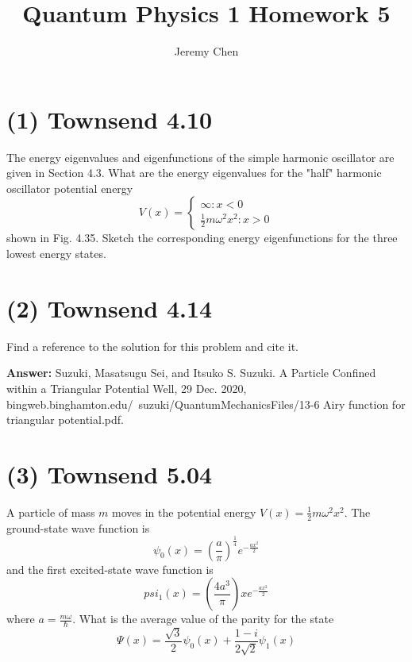 \documentclass[10pt,letterpaper]{article}
\title{Quantum Physics 1 Homework 5}
\author{Jeremy Chen}
\begin{document}
	\maketitle
\section*{(1) Townsend 4.10}
The energy eigenvalues and eigenfunctions of the simple harmonic oscillator are given in Section 4.3. What are the energy eigenvalues for the "half" harmonic oscillator potential energy
$$V(x) = \begin{cases}
\infty : x < 0 \\
\frac{1}{2}m\omega^{2}x^{2} : x > 0
\end{cases}$$
shown in Fig. 4.35. Sketch the corresponding energy eigenfunctions for the three lowest energy states. 
\begin{figure}[h!]
	\centering
\end{figure}

\section*{(2) Townsend 4.14}
Find a reference to the solution for this problem and cite it.

\textbf{Answer: }Suzuki, Masatsugu Sei, and Itsuko S. Suzuki. A Particle Confined within a Triangular Potential Well, 29 Dec. 2020, bingweb.binghamton.edu/~suzuki/QuantumMechanicsFiles/13-6 Airy function for triangular potential.pdf. 

\section*{(3) Townsend 5.04}
A particle of mass $m$ moves in the potential energy $V(x) = \frac{1}{2}m\omega^{2}x^{2}$. The ground-state wave function is 
$$\psi_{0}(x) = \left( \frac{a}{\pi} \right)^{\frac{1}{4}} e^{-\frac{ax^{2}}{2}}$$
and the first excited-state wave function is
$$psi_{1}(x) = \left( \frac{4a^{3}}{\pi} \right) xe^{-\frac{ax^{2}}{2}} $$
where $a = \frac{m\omega}{\hbar}$. What is the average value of the parity for the state
$$\Psi(x) = \frac{\sqrt{3}}{2} \psi_{0}(x) + \frac{1 - i}{2\sqrt{2}} \psi_{1}(x) $$
\end{document}
